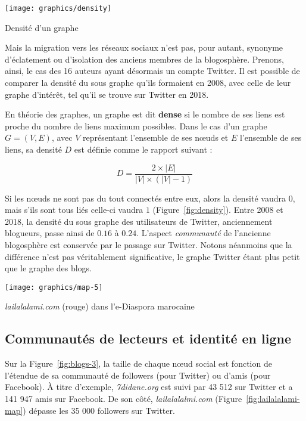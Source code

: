 \documentclass[symmetric,justified,marginals=raggedouter]{tufte-book}
\begin{document}
\begin{marginfigure}%
  \texttt{[image: graphics/density]}
  \vspace*{0.2cm}  
  \caption{Densité d'un graphe}
  \label{fig:density}
\end{marginfigure}

Mais la migration vers les réseaux sociaux n'est pas, pour autant, synonyme d'éclatement ou d'isolation des anciens membres de la blogosphère. Prenons, ainsi, le cas des 16 auteurs ayant désormais un compte Twitter. Il est possible de comparer la densité du sous graphe qu'ils formaient en 2008, avec celle de leur graphe d'intérêt, tel qu'il se trouve sur Twitter en 2018. 

En théorie des graphes, un graphe est dit \textbf{dense} si le nombre de ses liens est proche du nombre de liens maximum possibles. Dans le cas d'un graphe $G=(V,E)$, avec $V$ représentant l'ensemble de ses nœuds et $E$ l'ensemble de ses liens, sa densité $D$ est définie comme le rapport suivant :

\[
	D = \frac{2 \times |E|}{|V| \times (|V| - 1)}
\]

\noindent Si les nœuds ne sont pas du tout connectés entre eux, alors la densité vaudra $0$, mais s'ils sont tous liés celle-ci vaudra $1$ (Figure~\ref{fig:density}). Entre 2008 et 2018, la densité du sous graphe des utilisateurs de Twitter, anciennement blogueurs, passe ainsi de $0.16$ à $0.24$. L'aspect \textit{communauté} de l'ancienne blogosphère est conservée par le passage sur Twitter. Notons néanmoins que la différence n'est pas véritablement significative, le graphe Twitter étant plus petit que le graphe des blogs. 

\begin{marginfigure}%
  \texttt{[image: graphics/map-5]}
  \vspace*{0.2cm}  
  \caption{\textit{lailalalami.com} (rouge) dans l'e-Diaspora marocaine}
  \label{fig:lailalalami-map}
\end{marginfigure} 

\subsection{Communautés de lecteurs et identité en ligne}

\noindent Sur la Figure~\ref{fig:blogs-3}, la taille de chaque nœud social est fonction de l'étendue de sa communauté de followers (pour Twitter) ou d'amis (pour Facebook). À titre d'exemple, \textit{7didane.org} est suivi par 43 512 sur Twitter et a 141 947 amis sur Facebook. De son côté, \textit{lailalalalmi.com} (Figure~\ref{fig:lailalalami-map}) dépasse les 35 000 followers sur Twitter.
\end{document}
